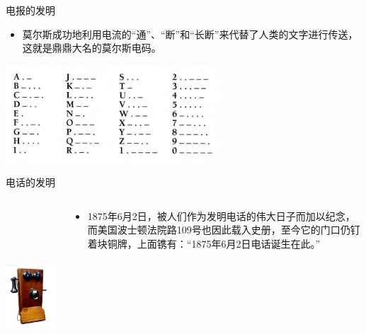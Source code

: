 \documentclass{beamer}
\begin{document}
\begin{frame}{电报的发明}
  \begin{itemize}
    \item 莫尔斯成功地利用电流的“通”、“断”和“长断”来代替了人类的文字进行传送，这就是鼎鼎大名的莫尔斯电码。
  \end{itemize}
  \centering
  \includegraphics[width=8cm]{morsecode}
\end{frame}

\begin{frame}{电话的发明}
  \begin{columns}
    \begin{column}{0.35\linewidth}
      \includegraphics[height=6.5cm]{dianhua}
    \end{column}
    \begin{column}{0.65\linewidth}
      \begin{itemize}
        \item 1875年6月2日，被人们作为发明电话的伟大日子而加以纪念，而美国波士顿法院路109号也因此载入史册，至今它的门口仍钉着块铜牌，上面镌有：“1875年6月2日电话诞生在此。”
      \end{itemize}
    \end{column}
  \end{columns}
\end{frame}
\end{document}
